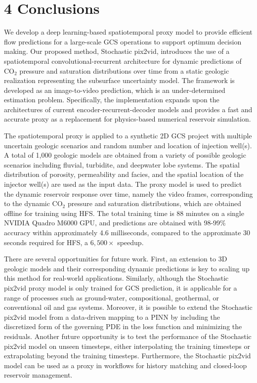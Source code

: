 \documentclass[10pt, twoside]{article}
\begin{document}
\section*{\textbf{4 Conclusions}}

We develop a deep learning-based spatiotemporal proxy model to provide efficient flow predictions for a large-scale GCS operations to support optimum decision making. Our proposed method, Stochastic pix2vid, introduces the use of a spatiotemporal convolutional-recurrent architecture for dynamic predictions of CO$_2$ pressure and saturation distributions over time from a static geologic realization representing the subsurface uncertainty model. The framework is developed as an image-to-video prediction, which is an under-determined estimation problem. Specifically, the implementation expands upon the architectures of current encoder-recurrent-decoder models and provides a fast and accurate proxy as a replacement for physics-based numerical reservoir simulation.

The spatiotemporal proxy is applied to a synthetic 2D GCS project with multiple uncertain geologic scenarios and random number and location of injection well(s). A total of 1,000 geologic models are obtained from a variety of possible geologic scenarios including fluvial, turbidite, and deepwater lobe systems. The spatial distribution of porosity, permeability and facies, and the spatial location of the injector well(s) are used as the input data. The proxy model is used to predict the dynamic reservoir response over time, namely the video frames, corresponding to the dynamic CO$_2$ pressure and saturation distributions, which are obtained offline for training using HFS. The total training time is 88 minutes on a single NVIDIA Quadro M6000 GPU, and predictions are obtained with 98-99\% accuracy within approximately 4.6 milliseconds, compared to the approximate 30 seconds required for HFS, a $6,500\times$ speedup. 

There are several opportunities for future work. First, an extension to 3D geologic models and their corresponding dynamic predictions is key to scaling up this method for real-world applications. Similarly, although the Stochastic pix2vid proxy model is only trained for GCS prediction, it is applicable for a range of processes such as ground-water, compositional, geothermal, or conventional oil and gas systems. Moreover, it is possible to extend the Stochastic pix2vid model from a data-driven mapping to a PINN by including the discretized form of the governing PDE in the loss function and minimizing the residuals. Another future opportunity is to test the performance of the Stochastic pix2vid model on unseen timesteps, either interpolating the training timesteps or extrapolating beyond the training timesteps. Furthermore, the Stochastic pix2vid model can be used as a proxy in workflows for history matching and closed-loop reservoir management. 
\end{document}
